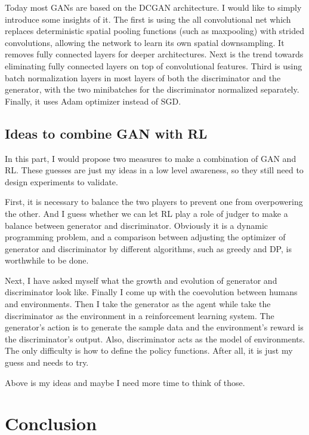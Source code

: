 \documentclass[10pt,twocolumn,letterpaper]{article}
\begin{document}
Today most GANs are based on the DCGAN architecture\cite{ref1}. I would like to simply introduce some insights of it. The first is 
using the all convolutional net  which replaces deterministic spatial pooling functions (such as maxpooling) with strided convolutions, allowing the network to learn its own spatial downsampling. It removes fully connected layers for deeper architectures. Next is the trend towards eliminating fully connected layers on top of convolutional features.  Third is using batch normalization layers\cite{batch} in most layers of both the discriminator and the generator, with the two minibatches for the discriminator normalized separately. Finally, it uses Adam optimizer\cite{adam} instead of SGD.

\subsection{Ideas to combine GAN with RL}

In this part, I would propose two measures to make a combination of GAN and RL. These guesses are just my ideas in a 
low level awareness, so they still need to design experiments to validate.

First, it is necessary to balance the two players to prevent one from overpowering the other. And I guess whether we can
let RL play a role of judger to make a balance between generator and discriminator. Obviously it is a dynamic 
programming problem, and a comparison between adjusting the optimizer of generator and discriminator by different
algorithms, such as greedy and DP, is worthwhile to be done. 

Next, I have asked myself what the growth and evolution of generator and discriminator look like. Finally I come up with
the coevolution between humans and environments. Then I take the generator as the agent while take the discriminator
as the environment in a reinforcement learning system. The generator's action is to generate the sample data and the 
environment's reward is the discriminator's output. Also, discriminator acts as the model of environments. The only 
difficulty is how to define the policy functions. After all, it is just my guess and needs to try.

Above is my ideas and maybe I need more time to think of those.

\section{Conclusion}
\end{document}

